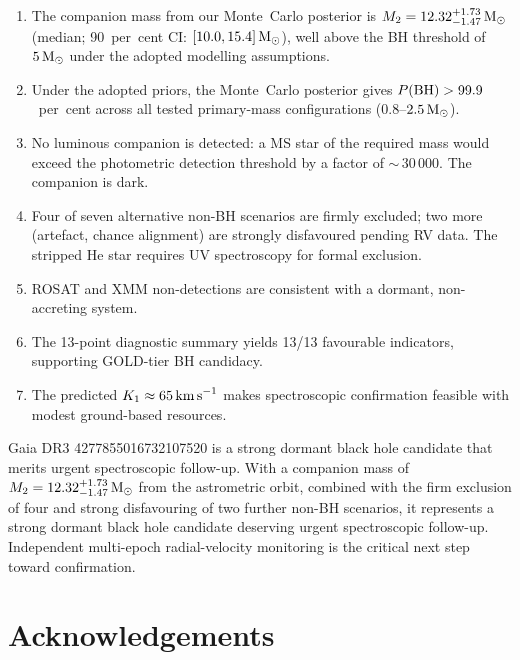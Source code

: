 \documentclass[usenatbib,fleqn]{mnras}
\newcommand{\Msun}{{\rm M}_\odot}
\newcommand{\kms}{{\rm km\,s}^{-1}}
\begin{document}
\begin{enumerate}
\item The companion mass from our Monte~Carlo posterior is
  $M_2 = 12.32^{+1.73}_{-1.47}\,\Msun$ (median;
  90~per~cent CI: $[10.0, 15.4]\,\Msun$), well above the BH
  threshold of $5\,\Msun$ under the adopted modelling
  assumptions.

\item Under the adopted priors, the Monte~Carlo posterior gives
  $P({\rm BH}) > 99.9$~per~cent across all tested
  primary-mass configurations ($0.8$--$2.5\,\Msun$).

\item No luminous companion is detected: a MS star of the required
  mass would exceed the photometric detection threshold by a factor
  of $\sim$\,$30\,000$.  The companion is dark.

\item Four of seven alternative non-BH scenarios are firmly excluded;
  two more (artefact, chance alignment) are strongly disfavoured
  pending RV data.  The stripped He star requires UV spectroscopy
  for formal exclusion.

\item ROSAT and XMM non-detections are consistent with a dormant,
  non-accreting system.

\item The 13-point diagnostic summary yields 13/13 favourable
  indicators, supporting GOLD-tier BH candidacy.

\item The predicted $K_1 \approx 65\,\kms$ makes spectroscopic
  confirmation feasible with modest ground-based resources.
\end{enumerate}

Gaia DR3 4277855016732107520 is a strong dormant black hole
candidate that merits urgent spectroscopic follow-up.  With a
companion mass of
$M_2 = 12.32^{+1.73}_{-1.47}\,\Msun$ from the astrometric orbit,
combined with the firm exclusion of four and strong disfavouring of
two further non-BH scenarios, it
represents a strong dormant black hole candidate deserving urgent
spectroscopic follow-up.  Independent multi-epoch radial-velocity
monitoring is the critical next step toward confirmation.

\section*{Acknowledgements}
\end{document}

